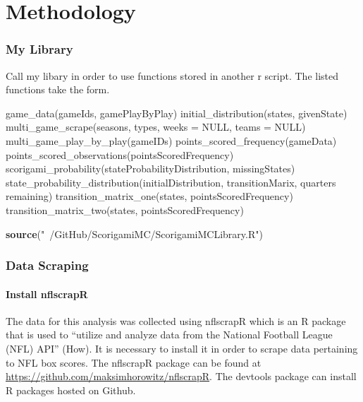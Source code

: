 \documentclass[
]{article}
\newenvironment{Shaded}{\begin{snugshade}}{\end{snugshade}}
\newcommand{\KeywordTok}[1]{\textcolor[rgb]{0.13,0.29,0.53}{\textbf{#1}}}
\newcommand{\NormalTok}[1]{#1}
\newcommand{\StringTok}[1]{\textcolor[rgb]{0.31,0.60,0.02}{#1}}
\let\oldparagraph\paragraph
\renewcommand{\paragraph}[1]{\oldparagraph{#1}\mbox{}}
\begin{document}
\hypertarget{methodology}{%
\section{Methodology}\label{methodology}}

\hypertarget{my-library}{%
\subsubsection{My Library}\label{my-library}}

Call my libary in order to use functions stored in another r script. The
listed functions take the form.

game\_data(gameIds, gamePlayByPlay) initial\_distribution(states,
givenState) multi\_game\_scrape(seasons, types, weeks = NULL, teams =
NULL) multi\_game\_play\_by\_play(gameIDs)
points\_scored\_frequency(gameData)
points\_scored\_observations(pointsScoredFrequency)
scorigami\_probability(stateProbabilityDistribution, missingStates)
state\_probability\_distribution(initialDistribution, transitionMarix,
quarters remaining) transition\_matrix\_one(states,
pointsScoredFrequency) transition\_matrix\_two(states,
pointsScoredFrequency)

\begin{Shaded}
\begin{Highlighting}[]
\KeywordTok{source}\NormalTok{(}\StringTok{"~/GitHub/ScorigamiMC/ScorigamiMCLibrary.R"}\NormalTok{)}
\end{Highlighting}
\end{Shaded}

\hypertarget{data-scraping}{%
\subsubsection{Data Scraping}\label{data-scraping}}

\hypertarget{install-nflscrapr}{%
\paragraph{Install nflscrapR}\label{install-nflscrapr}}

The data for this analysis was collected using nflscrapR which is an R
package that is used to ``utilize and analyze data from the National
Football League (NFL) API'' (How). It is necessary to install it in
order to scrape data pertaining to NFL box scores. The nflscrapR package
can be found at \url{https://github.com/maksimhorowitz/nflscrapR}. The
devtools package can install R packages hosted on Github.
\end{document}
